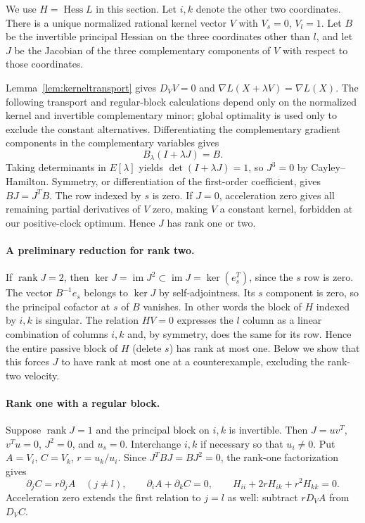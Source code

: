 \documentclass[11pt,a4paper]{article}
\newcommand{\Hess}{\operatorname{Hess}}
\newcommand{\rank}{\operatorname{rank}}
\newcommand{\im}{\operatorname{im}}
\begin{document}
We use $H=\Hess L$ in this section. Let $i,k$ denote the other two coordinates. There is a unique normalized rational kernel vector $V$ with $V_s=0$, $V_l=1$. Let $B$ be the invertible principal Hessian on the three coordinates other than $l$, and let $J$ be the Jacobian of the three complementary components of $V$ with respect to those coordinates.

Lemma~\ref{lem:kerneltransport} gives $D_VV=0$ and $\nabla L(X+\lambda V)=\nabla L(X)$. The following transport and regular-block calculations depend only on the normalized kernel and invertible complementary minor; global optimality is used only to exclude the constant alternatives. Differentiating the complementary gradient components in the complementary variables gives
\[
 B_\lambda(I+\lambda J)=B.
\]
Taking determinants in $E[\lambda]$ yields $\det(I+\lambda J)=1$, so $J^3=0$ by Cayley--Hamilton. Symmetry, or differentiation of the first-order coefficient, gives $BJ=J^TB$. The row indexed by $s$ is zero. If $J=0$, acceleration zero gives all remaining partial derivatives of $V$ zero, making $V$ a constant kernel, forbidden at our positive-clock optimum. Hence $J$ has rank one or two.

\paragraph{A preliminary reduction for rank two.}
If $\rank J=2$, then $\ker J=\im J^2\subset\im J=\ker(e_s^T)$, since the $s$ row is zero. The vector $B^{-1}e_s$ belongs to $\ker J$ by self-adjointness. Its $s$ component is zero, so the principal cofactor at $s$ of $B$ vanishes. In other words the block of $H$ indexed by $i,k$ is singular. The relation $HV=0$ expresses the $l$ column as a linear combination of columns $i,k$ and, by symmetry, does the same for its row. Hence the entire passive block of $H$ (delete $s$) has rank at most one. Below we show that this forces $J$ to have rank at most one at a counterexample, excluding the rank-two velocity.

\paragraph{Rank one with a regular block.}
Suppose $\rank J=1$ and the principal block on $i,k$ is invertible. Then $J=uv^T$, $v^Tu=0$, $J^2=0$, and $u_s=0$. Interchange $i,k$ if necessary so that $u_i\ne0$. Put $A=V_i$, $C=V_k$, $r=u_k/u_i$. Since $J^TBJ=BJ^2=0$, the rank-one factorization gives
\begin{equation}\label{eq:slope}
 \partial_j C=r\partial_j A\quad(j\ne l),\qquad
 \partial_i A+\partial_k C=0,\qquad
 H_{ii}+2rH_{ik}+r^2H_{kk}=0 .
\end{equation}
Acceleration zero extends the first relation to $j=l$ as well: subtract $rD_VA$ from $D_VC$.
\end{document}
